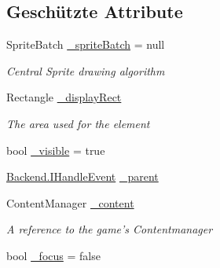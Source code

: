 \subsection*{Geschützte Attribute}
\begin{DoxyCompactItemize}
\item 
Sprite\-Batch \hyperlink{class_gruppe22_1_1_client_1_1_u_i_element_a596a162cb2c82f02823b7669f51c3825}{\-\_\-sprite\-Batch} = null
\begin{DoxyCompactList}\small\item\em Central Sprite drawing algorithm \end{DoxyCompactList}\item 
Rectangle \hyperlink{class_gruppe22_1_1_client_1_1_u_i_element_a1642baaf247dc3886114f13a000aa8c7}{\-\_\-display\-Rect}
\begin{DoxyCompactList}\small\item\em The area used for the element \end{DoxyCompactList}\item 
bool \hyperlink{class_gruppe22_1_1_client_1_1_u_i_element_a480a8fd4352ce4b6ea73d7fd29d98260}{\-\_\-visible} = true
\item 
\hyperlink{interface_gruppe22_1_1_backend_1_1_i_handle_event}{Backend.\-I\-Handle\-Event} \hyperlink{class_gruppe22_1_1_client_1_1_u_i_element_a261861b9b1127fd7a734b8a81cdff947}{\-\_\-parent}
\item 
Content\-Manager \hyperlink{class_gruppe22_1_1_client_1_1_u_i_element_ad9f67f490023c7b1e3760b76c2a4ee6b}{\-\_\-content}
\begin{DoxyCompactList}\small\item\em A reference to the game's Contentmanager \end{DoxyCompactList}\item 
bool \hyperlink{class_gruppe22_1_1_client_1_1_u_i_element_a6eefefe26cd51bad3b096c9c3d2aac90}{\-\_\-focus} = false
\end{DoxyCompactItemize}
